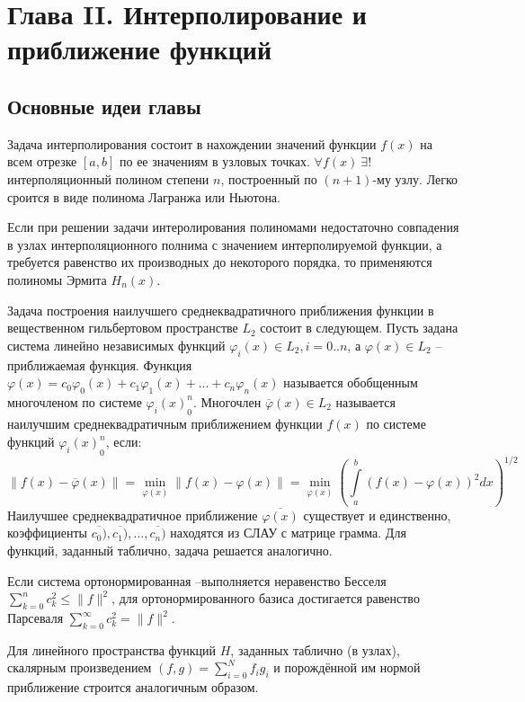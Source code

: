 \newpage
{}
\pagestyle{empty}
\vspace{0.5cm}

\section*{Глава II. Интерполирование и приближение функций}

\subsection{Основные идеи главы} 

Задача интерполирования состоит в нахождении значений функции $f(x)$
на всем отрезке $[a,b]$ по ее значениям в узловых точках. $\forall f(x)~\exists!$ интерполяционный полином степени $n$, построенный по $(n+1)$-му узлу. Легко сроится в виде полинома Лагранжа или Ньютона.

Если при решении задачи интеролирования полиномами недостаточно совпадения в узлах интерполяционного полнима с значением интерполируемой функции, а требуется равенство их производных до некоторого порядка, то применяются полиномы Эрмита $H_n (x)$.

Задача построения наилучшего среднеквадратичного приближения функции в вещественном гильбертовом пространстве $L_2$ состоит в следующем. Пусть задана система линейно независимых функций $\varphi_i(x) \in L_2, i=0..n$, а $\varphi(x) \in L_2$ -- приближаемая функция. Функция $\varphi(x) = c_0\varphi_0(x) + c_1\varphi_1(x) + ... + c_n\varphi_n(x)$ называется обобщенным многочленом по системе ${\varphi_i(x)}_0^n$. Многочлен $\overline{\varphi}(x) \in L_2$ называется наилучшим среднеквадратичным приближением функции $f(x)$ по системе функций ${\varphi_i(x)}_0^n$, если:
$$
    \|f(x)-\overline{\varphi}(x)\|=\min\limits_{\varphi(x)}{\|f(x)-
    \varphi(x)\|}=\min\limits_{\varphi(x)}{\left(\int\limits_a^b
    {\left(f(x)-\varphi(x)\right)^2dx}\right)^{1/2}}
$$
Наилучшее среднеквадратичное приближение $\overline{\varphi(x)}$ существует и единственно, коэффициенты $\overline{c_0)}, \overline{c_1)}, ..., \overline{c_n)}$ находятся из СЛАУ с матрице грамма. Для функций, заданный таблично, задача решается аналогично.

Если система ортонормированная –выполняется неравенство Бесселя $\sum_{k=0}^n c_k^2 \leqslant \|f\|^2$, для ортонормированного базиса достигается равенство Парсеваля $\sum_{k=0}^\infty c_k^2 = \|f\|^2.$

Для линейного пространства функций $H$, заданных таблично (в узлах),  скалярным произведением $(f,g) = \sum\limits_{i=0}^N f_i g_i$ и порождённой им нормой приближение строится аналогичным образом.

